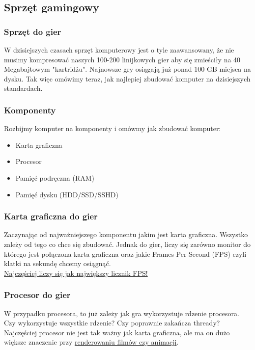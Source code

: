 \documentclass{beamer}
\begin{document}
\subsection{Sprzęt gamingowy}

\begin{frame}
\frametitle{Sprzęt do gier}
    W dzisiejszych czasach sprzęt komputerowy jest o tyle zaawansowany, że nie musimy kompresować naszych 100-200 linijkowych gier aby się zmieściły na 40 Megabajtowym "kartridżu". Najnowsze gry osiągają już ponad 100 GB miejsca na dysku. Tak więc omówimy teraz, jak najlepiej zbudować komputer na dzisiejszych standardach.
\end{frame}


\begin{frame}
\frametitle{Komponenty}
    Rozbijmy komputer na komponenty i omówmy jak zbudować komputer:
    \begin{itemize}
        \item Karta graficzna
        \item Procesor
        \item Pamięć podręczna (RAM)
        \item Pamięć dysku (HDD/SSD/SSHD)
    \end{itemize}
\end{frame}


\begin{frame}
\frametitle{Karta graficzna do gier}
    Zaczynając od najważniejszego komponentu jakim jest karta graficzna. Wszystko zależy od tego co chce się zbudować. Jednak do gier, liczy się zarówno monitor do którego jest połączona karta graficzna oraz jakie Frames Per Second (FPS) czyli klatki na sekundę chcemy osiągnąć.\\
    \underline{Najczęściej liczy się jak największy licznik FPS!}
\end{frame}


\begin{frame}
\frametitle{Procesor do gier}
    W przypadku procesora, to już zależy jak gra wykorzystuje rdzenie procesora. Czy wykorzystuje wszystkie rdzenie? Czy poprawnie zakańcza thready?\\
    Najczęściej procesor nie jest tak ważny jak karta graficzna, ale ma on dużo większe znaczenie przy \underline{renderowaniu filmów czy animacji}.
\end{frame}
\end{document}

